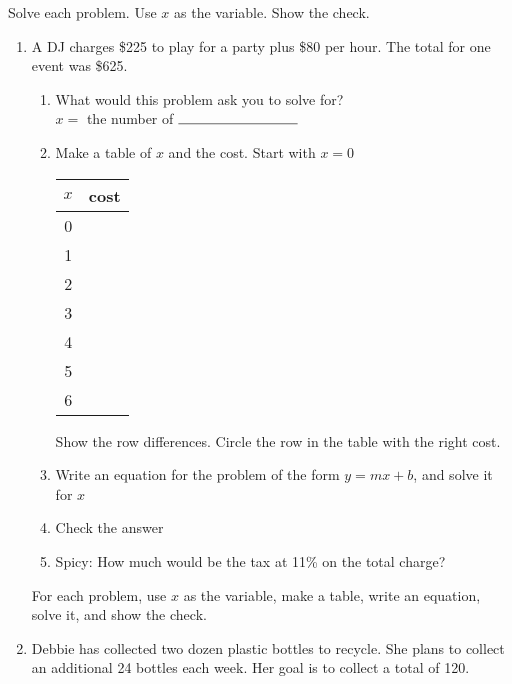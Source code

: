 \documentclass[12pt, oneside]{article}
\begin{document}
Solve each problem. Use $x$ as the variable. Show the check.
  \begin{enumerate}
\subsubsection*{Word Problem Wednesday}

  \item A DJ charges \$225 to play for a party plus \$80 per hour. The total for one event was \$625.
  \begin{enumerate}
    \item What would this problem ask you to solve for? \\[0.5cm]
    \hspace{1cm} $x=$ the number of $\rule{3cm}{0.15mm}$
    \item Make a table of $x$ and the cost. Start with $x=0$ \\[0.5cm]
    \begin{center}
      \begin{tabular}{|c|r|}
      \hline
      $x$ & cost\\
      \hline
      0 &  \\
      \hline
      1 &  \\
      \hline
      2 &  \\
      \hline
      3 &  \\
      \hline
      4 &  \\
      \hline
      5 &  \\
      \hline
      6 &  \\
      \hline
      \end{tabular}
    \end{center}
    Show the row differences. Circle the row in the table with the right cost.
    \item Write an equation for the problem of the form $y=mx+b$, and solve it for $x$ \vspace{3.5cm}
    \item Check the answer \vspace{2.5cm}
    \item Spicy: How much would be the tax at 11\% on the total charge?
  \end{enumerate}

\newpage
For each problem, use $x$ as the variable, make a table, write an equation, solve it, and show the check. \\%

  \item Debbie has collected two dozen plastic bottles to recycle. She plans to collect an additional 24 bottles each week. Her goal is to collect a total of 120. \vspace{8cm}


\end{enumerate}
\end{document}

